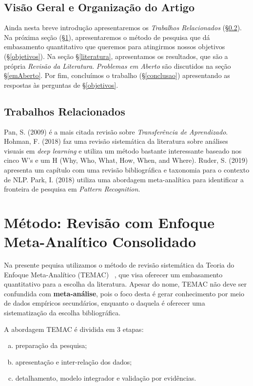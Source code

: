 \documentclass[sigconf]{acmart}
\begin{document}
  \subsection{Visão Geral e Organização do Artigo}
  Ainda nesta breve introdução apresentaremos os \emph{Trabalhos Relacionados} (\S\ref{related}). Na próxima seção (\S\ref{TEMAC}), apresentaremos o método de pesquisa que dá embasamento quantitativo que queremos para atingirmos nossos objetivos (\S\ref{objetivos}). Na seção \S\ref{literatura}, apresentamos os resultados, que são a própria  \emph{Revisão da Literatura}. \emph{Problemas em Aberto} são discutidos na seção \S\ref{emAberto}. Por fim, concluímos o trabalho (\S\ref{conclusao}) apresentando as respostas às perguntas de \S\ref{objetivos}.
  

  \subsection{Trabalhos Relacionados}\label{related}
  Pan, S. (2009)\cite{PanYang} é a mais citada revisão sobre \emph{Transferência de Aprendizado}. Hohman, F. (2018)\cite{hohman2018visual} faz uma revisão sistemática da literatura sobre análises visuais em \emph{deep learning} e utiliza um método bastante interessante baseado nos cinco W's e um H (Why, Who, What, How, When, and Where). Ruder, S. (2019) \cite{Ruder2019Neural} apresenta um capítulo com uma revisão bibliográfica e taxonomia para o contexto de NLP. Park, I. (2018)\cite{park2018identifying} utiliza uma abordagem meta-analítica para identificar a fronteira de pesquisa em \emph{Pattern Recognition}.
\section{Método: Revisão com Enfoque Meta-Analítico Consolidado}\label{TEMAC}
Na presente pequisa utilizamos o método de revisão sistemática da Teoria do Enfoque Meta-Analítico (TEMAC) ~\cite{Mariano}, que visa oferecer um embasamento quantitativo para a escolha da literatura. Apesar do nome, TEMAC não deve ser confundida com \textbf{meta-análise}, pois o foco desta é gerar conhecimento por meio de dados empíricos secundários, enquanto o daquela é oferecer uma sistematização da escolha bibliográfica.

A abordagem TEMAC é dividida em 3 etapas: 
  \begin{enumerate}[a)]
    \item preparação da pesquisa;
    \item apresentação e inter-relação dos dados;
    \item detalhamento, modelo integrador e validação por evidências.
  \end{enumerate}
\end{document}
